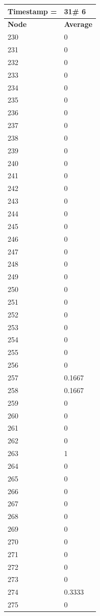 \begin{tabular}{|l||l|}
\hline
\textbf{Timestamp =} & \textbf{31}\# 6\\\hline
	\textbf{Node} & \textbf{Average} \\ \hline
\hline
	230 & 0 \\ \hline
	231 & 0 \\ \hline
	232 & 0 \\ \hline
	233 & 0 \\ \hline
	234 & 0 \\ \hline
	235 & 0 \\ \hline
	236 & 0 \\ \hline
	237 & 0 \\ \hline
	238 & 0 \\ \hline
	239 & 0 \\ \hline
	240 & 0 \\ \hline
	241 & 0 \\ \hline
	242 & 0 \\ \hline
	243 & 0 \\ \hline
	244 & 0 \\ \hline
	245 & 0 \\ \hline
	246 & 0 \\ \hline
	247 & 0 \\ \hline
	248 & 0 \\ \hline
	249 & 0 \\ \hline
	250 & 0 \\ \hline
	251 & 0 \\ \hline
	252 & 0 \\ \hline
	253 & 0 \\ \hline
	254 & 0 \\ \hline
	255 & 0 \\ \hline
	256 & 0 \\ \hline
	257 & 0.1667 \\ \hline
	258 & 0.1667 \\ \hline
	259 & 0 \\ \hline
	260 & 0 \\ \hline
	261 & 0 \\ \hline
	262 & 0 \\ \hline
	263 & 1 \\ \hline
	264 & 0 \\ \hline
	265 & 0 \\ \hline
	266 & 0 \\ \hline
	267 & 0 \\ \hline
	268 & 0 \\ \hline
	269 & 0 \\ \hline
	270 & 0 \\ \hline
	271 & 0 \\ \hline
	272 & 0 \\ \hline
	273 & 0 \\ \hline
	274 & 0.3333 \\ \hline
	275 & 0 \\ \hline
\end{tabular}

